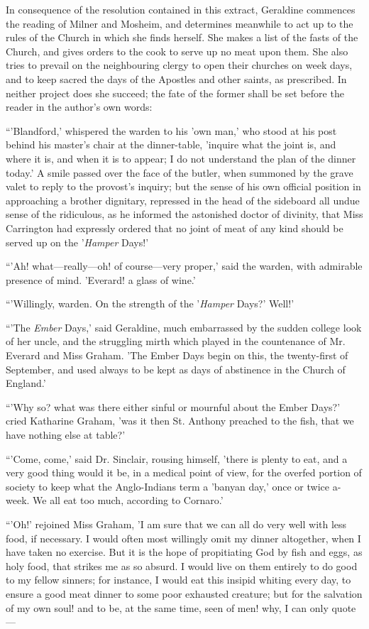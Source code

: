 In consequence of the resolution contained in this
extract, Geraldine commences the reading of Milner and Mosheim, and
determines meanwhile to act up to the rules of the Church in which she
finds herself. She makes a list of the fasts of the Church, and gives
orders to the cook to serve up no meat upon them. She also tries to
prevail on the neighbouring clergy to open their churches on week days,
and to keep sacred the days of the Apostles and other saints, as
prescribed. In neither project does she succeed; the fate of the former
shall be set before the reader in the author's own words:

``'Blandford,' whispered the warden
to his 'own man,' who stood at his post behind his master's chair at the
dinner-table, 'inquire what the joint is, and where it is, and when it
is to appear; I do not understand the plan of the dinner today.' A smile
passed over the face of the butler, when summoned by the grave valet to
reply to the provost's inquiry; but the sense of his own official
position in approaching a brother dignitary, repressed in the head of
the sideboard all undue sense of the ridiculous, as he informed the
astonished doctor of divinity, that Miss Carrington had expressly
ordered that no joint of meat of any kind should be served up on the '\emph{Hamper}
Days!'

``'Ah! what—really—oh! of
course—very proper,' said the warden, with admirable presence of mind.
'Everard! a glass of wine.'

``'Willingly, warden. On the strength
of the '\emph{Hamper} Days?' Well!'

``'The \emph{Ember} Days,' said
Geraldine, much embarrassed by the sudden college look of her uncle, and
the struggling mirth which played in the countenance of Mr. Everard and
Miss Graham. 'The Ember Days begin on this, the twenty-first of
September, and used always to be kept as days of abstinence in the
Church of England.'

``'Why so? what was there either
sinful or mournful about the Ember Days?' cried Katharine Graham, 'was
it then St. Anthony preached to the fish, that we have nothing else at
table?'

``'Come, come,' said Dr. Sinclair,
rousing himself, 'there is plenty to eat, and a very good thing would it
be, in a medical point of view, for the overfed portion of society to
keep what the Anglo-Indians term a 'banyan day,' once or twice a-week.
We all eat too much, according to Cornaro.'

``'Oh!' rejoined Miss Graham, 'I am
sure that we can all do very well with less food, if necessary. I would
often most willingly omit my dinner altogether, when I have taken no
exercise. But it is the hope of propitiating God by fish and eggs, as
holy food, that strikes me as so absurd. I would live on them entirely
to do good to my fellow sinners; for instance, I would eat this insipid
whiting every day, to ensure a good meat dinner to some poor exhausted
creature; but for the salvation of my own soul! and to be, at the same
time, seen of men! why, I can only quote—

